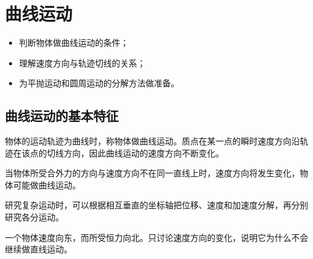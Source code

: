 \chapter{曲线运动}
\label{chap:curvilinear-motion}

\begin{learninggoals}
  \begin{itemize}[leftmargin=2em]
    \item 判断物体做曲线运动的条件；
    \item 理解速度方向与轨迹切线的关系；
    \item 为平抛运动和圆周运动的分解方法做准备。
  \end{itemize}
\end{learninggoals}


\section{曲线运动的基本特征}

物体的运动轨迹为曲线时，称物体做曲线运动。质点在某一点的瞬时速度方向沿轨迹在该点的切线方向，因此曲线运动的速度方向不断变化。

\begin{definitionbox}[曲线运动的条件]
  当物体所受合外力的方向与速度方向不在同一直线上时，速度方向将发生变化，物体可能做曲线运动。
\end{definitionbox}

\begin{examplebox}[运动的合成]
  研究复杂运动时，可以根据相互垂直的坐标轴把位移、速度和加速度分解，再分别研究各分运动。
\end{examplebox}

\begin{exercisebox}
  一个物体速度向东，而所受恒力向北。只讨论速度方向的变化，说明它为什么不会继续做直线运动。
\end{exercisebox}
